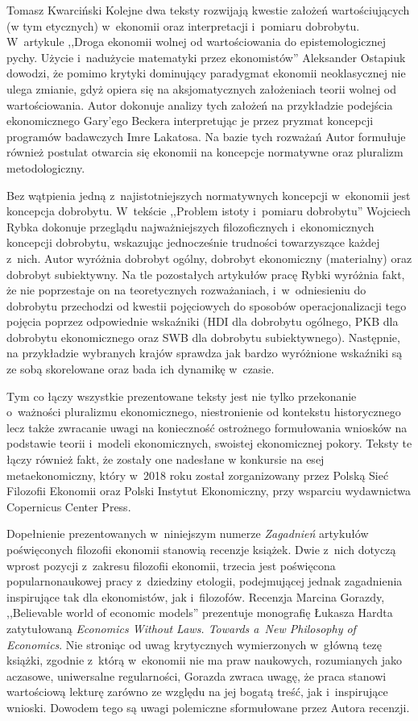 \begin{editorial}{Tomasz Kwarciński}
Kolejne dwa teksty rozwijają kwestie założeń wartościujących (w tym etycznych) w~ekonomii oraz interpretacji i~pomiaru
dobrobytu. W~artykule ,,Droga ekonomii wolnej od wartościowania do epistemologicznej pychy. Użycie i~nadużycie
matematyki przez ekonomistów'' Aleksander Ostapiuk dowodzi, że pomimo krytyki dominujący paradygmat ekonomii
neoklasycznej nie ulega zmianie, gdyż opiera się na aksjomatycznych założeniach teorii wolnej od wartościowania. Autor
dokonuje analizy tych założeń na przykładzie podejścia ekonomicznego Gary’ego Beckera interpretując je przez pryzmat
koncepcji programów badawczych Imre Lakatosa. Na bazie tych rozważań Autor formułuje również postulat otwarcia się
ekonomii na koncepcje normatywne oraz pluralizm metodologiczny.

Bez wątpienia jedną z~najistotniejszych normatywnych koncepcji w~ekonomii jest koncepcja dobrobytu. W~tekście ,,Problem
istoty i~pomiaru dobrobytu'' Wojciech Rybka dokonuje przeglądu najważniejszych filozoficznych i~ekonomicznych koncepcji
dobrobytu, wskazując jednocześnie trudności towarzyszące każdej z~nich. Autor wyróżnia dobrobyt ogólny, dobrobyt
ekonomiczny (materialny) oraz dobrobyt subiektywny. Na tle pozostałych artykułów pracę Rybki wyróżnia fakt, że nie 
poprzestaje on na teoretycznych rozważaniach, i~w~odniesieniu do dobrobytu przechodzi od kwestii pojęciowych do sposobów
operacjonalizacji tego pojęcia poprzez odpowiednie wskaźniki (HDI dla dobrobytu ogólnego, PKB dla dobrobytu
ekonomicznego oraz SWB dla dobrobytu subiektywnego). Następnie, na przykładzie wybranych krajów sprawdza jak bardzo
wyróżnione wskaźniki są ze sobą skorelowane oraz bada ich dynamikę w~czasie. 

Tym co łączy wszystkie prezentowane teksty jest nie tylko przekonanie o~ważności pluralizmu ekonomicznego, niestronienie
od kontekstu historycznego lecz także zwracanie uwagi na konieczność ostrożnego formułowania wniosków na podstawie
teorii i~modeli ekonomicznych, swoistej ekonomicznej pokory. Teksty te łączy również fakt, że zostały one nadesłane w
konkursie na esej metaekonomiczny, który w~2018 roku został zorganizowany przez Polską Sieć Filozofii Ekonomii oraz
Polski Instytut Ekonomiczny, przy wsparciu wydawnictwa Copernicus Center Press. 

Dopełnienie prezentowanych w~niniejszym numerze \textit{Zagadnień} artykułów poświęconych filozofii ekonomii stanowią
recenzje książek. Dwie z~nich dotyczą wprost pozycji z~zakresu filozofii ekonomii,
trzecia jest poświęcona popularnonaukowej pracy z~dziedziny etologii,
podejmującej jednak zagadnienia inspirujące tak dla ekonomistów, jak i~filozofów.
Recenzja Marcina Gorazdy, ,,Believable world of economic models'' prezentuje
monografię Łukasza Hardta zatytułowaną \textit{Economics Without Laws. Towards a~New Philosophy of Economics}. Nie
stroniąc od uwag krytycznych wymierzonych w~główną tezę książki, zgodnie z~którą w~ekonomii nie ma praw naukowych,
rozumianych jako aczasowe, uniwersalne regularności, Gorazda zwraca uwagę, że praca stanowi wartościową lekturę zarówno
ze względu na jej bogatą treść, jak i~inspirujące wnioski. Dowodem tego są uwagi polemiczne sformułowane przez Autora
recenzji. 


\end{editorial}
